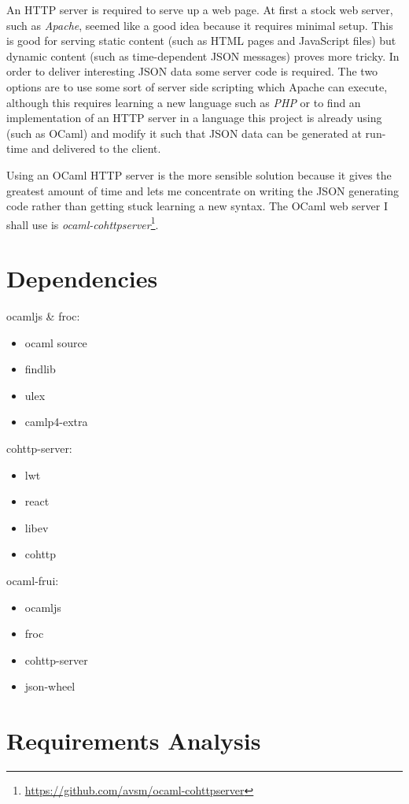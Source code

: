 An HTTP server is required to serve up a web page. At first a stock web server, such as \emph{Apache}, seemed like a good idea because it requires minimal setup. This is good for serving static content (such as HTML pages and JavaScript files) but dynamic content (such as time-dependent JSON messages) proves more tricky. In order to deliver interesting JSON data some server code is required. The two options are to use some sort of server side scripting which Apache can execute, although this requires learning a new language such as \emph{PHP} or to find an implementation of an HTTP server in a language this project is already using (such as OCaml) and modify it such that JSON data can be generated at run-time and delivered to the client.

Using an OCaml HTTP server is the more sensible solution because it gives the greatest amount of time and lets me concentrate on writing the JSON generating code rather than getting stuck learning a new syntax. The OCaml web server I shall use is \emph{ocaml-cohttpserver}\footnote{\url{https://github.com/avsm/ocaml-cohttpserver}}.

\section{Dependencies}
ocamljs \& froc:
\begin{itemize}
\item ocaml source
\item findlib
\item ulex
\item camlp4-extra
\end{itemize}
cohttp-server:
\begin{itemize}
\item lwt
\item react
\item libev
\item cohttp
\end{itemize}
ocaml-frui:
\begin{itemize}
\item ocamljs
\item froc
\item cohttp-server
\item json-wheel
\end{itemize}

\section{Requirements Analysis}
